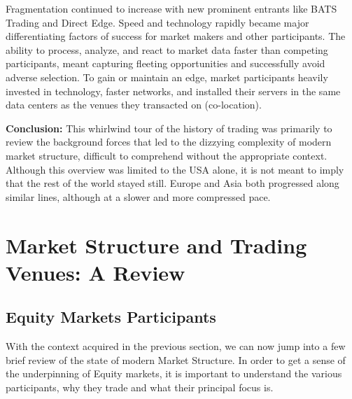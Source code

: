 Fragmentation continued to increase with new prominent entrants like BATS Trading and Direct Edge.  Speed and technology rapidly became major differentiating factors of success for market makers and other participants. The ability to process, analyze, and react to market data faster than competing participants, meant capturing fleeting opportunities and successfully avoid adverse selection. To gain or maintain an edge, market participants heavily invested in technology, faster networks, and installed their servers in the same data centers as the venues they transacted on (co-location). \twomedskip

\noindent\textbf{Conclusion:} This whirlwind tour of the history of trading was primarily to review the background forces that led to the dizzying complexity of modern market structure, difficult to comprehend without the appropriate context. Although this overview was limited to the USA alone, it is not meant to imply that the rest of the world stayed still. Europe and Asia both progressed along similar lines, although at a slower and more compressed pace.
\section{Market Structure and Trading Venues: A Review}

\subsection{Equity Markets Participants} 

With the context acquired in the previous section, we can now jump into a few brief review of the state of modern Market Structure. In order to get a sense of the underpinning of Equity markets, it is important to understand the various participants, why they trade and what their principal focus is. \twomedskip


